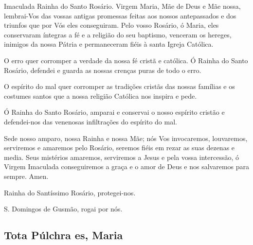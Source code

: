  Imaculada Rainha do Santo Rosário. Virgem Maria, Mãe de Deus e Mãe nossa, lembrai-Vos das vossas antigas promessas feitas aos nossos antepassados e dos triunfos que por Vós eles conseguiram. Pelo vosso Rosário, ó Maria, eles conservaram íntegras a fé e a religião do seu baptismo, venceram os hereges, inimigos da nossa Pátria e permaneceram fiéis à santa Igreja Católica.\par
O erro quer corromper a verdade da nossa fé cristã e católica. Ó Rainha do Santo Rosário, defendei e guarda as nossas crenças puras de todo o erro.\par
O espírito do mal quer corromper as tradições cristãs das nossas famílias e os costumes santos que a nossa religião Católica nos inspira e pede.\par
Ó Rainha do Santo Rosário, amparai e conservai o nosso espírito cristão e defendei-nos das venenosas infiltrações do espírito do mal.\par
Sede nosso amparo, nossa Rainha e nossa Mãe; nós Vos invocaremos, louvaremos, serviremos e amaremos pelo Rosário, seremos fiéis em rezar as suas dezenas e media. Seus mistérios amaremos, serviremos a Jesus e pela vossa intercessão, ó Virgem Imaculada conseguiremos a graça e o amor de Deus e nos salvaremos para sempre. Amen.\par
Rainha do Santíssimo Rosário, protegei-nos.\par
S. Domingos de Gusmão, rogai por nós.\par

\subsection{Tota Púlchra es, Maria}

